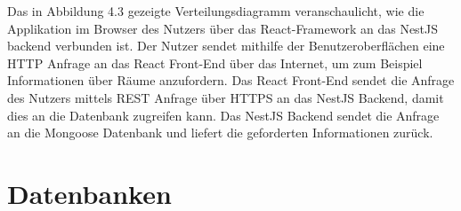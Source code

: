 Das in Abbildung 4.3 gezeigte Verteilungsdiagramm veranschaulicht, wie die Applikation im Browser des Nutzers über das React-Framework an das NestJS backend verbunden ist.
Der Nutzer sendet mithilfe der Benutzeroberflächen eine HTTP Anfrage an das React Front-End über das Internet, um zum Beispiel Informationen über Räume anzufordern.
Das React Front-End sendet die Anfrage des Nutzers mittels REST Anfrage über HTTPS an das NestJS Backend, damit dies an die Datenbank zugreifen kann.
Das NestJS Backend sendet die Anfrage an die Mongoose Datenbank und liefert die geforderten Informationen zurück.


\section{Datenbanken}
